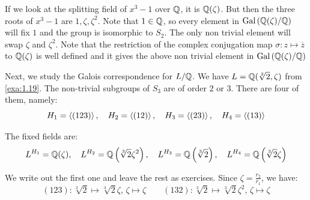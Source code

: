 \documentclass[twoside = false,	%
		headsepline,		%
		parskip = true,
		]{scrbook}						%
\begin{document}
        
        If we look at the splitting field of $x^3 - 1$ over $\mathbb Q$, it is $\mathbb Q(\zeta)$. But then the three roots of $x^3 - 1$ are $1, \zeta,\zeta^2$. Note that $1 \in \mathbb Q$, so every element in $\mathrm{Gal}\left( \mathbb Q(\zeta)/\mathbb Q\right)$ will fix $1$ and the group is isomorphic to $S_2$. The only non trivial element will swap $\zeta$ and $\zeta^2$. Note that the restriction of the complex conjugation map $\sigma:z \mapsto \overline{z}$ to $\mathbb Q(\zeta)$ is well defined and it gives the above non trivial element in $\mathrm{Gal}\left( \mathbb Q(\zeta)/\mathbb Q\right)$
        
        
        \begin{center}
        \end{center}
        Next, we study the Galois correspondence for $L/\mathbb Q$. We have $L = \mathbb Q(\sqrt[3]{2},\zeta)$ from \ref{exa:1.19}. The non-trivial subgroups of $S_3$ are of order $2$ or $3$. There are four of them, namely:
        \begin{equation*}
            H_1 = \left\langle (123)\right\rangle, \quad H_2 = \left\langle (12)\right\rangle, \quad H_3 = \left\langle (23)\right\rangle, \quad H_4 = \left\langle (13)\right\rangle
        \end{equation*}
        
        The fixed fields are:
        \begin{equation*}
            L^{H_1} = \mathbb Q(\zeta), \quad L^{H_2} = \mathbb Q\left( \sqrt[3]{2} \zeta^2\right), \quad L^{H_3} = \mathbb Q\left( \sqrt[3]{2}\right), \quad L^{H_4} = \mathbb Q\left( \sqrt[3]{2}\zeta\right)
        \end{equation*}
        
        We write out the first one and leave the rest as exercises. Since $\zeta = \frac{r_2}{r_1}$, we have:
	    \begin{equation*}
			(123): \sqrt[3]{2} \mapsto \sqrt[3]{2}\zeta, \, \zeta \mapsto \zeta \qquad (132): \sqrt[3]{2} \mapsto \sqrt[3]{2} \zeta^2, \, \zeta \mapsto \zeta
    	\end{equation*}
    	
\end{document}
